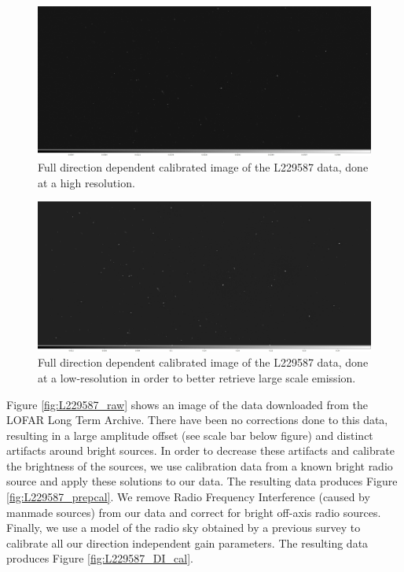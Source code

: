 \begin{figure}[!htb]
    \centering
    \includegraphics[width=.8\linewidth]{background/figures/full_ampphase.jpeg}
    \caption[Fully calibrated image]{Full direction dependent calibrated image of the L229587 data, done at a high resolution. }
    \label{fig:L229587_full_high}
\end{figure}

\begin{figure}[!htb]
    \centering
    \includegraphics[width=.8\linewidth]{background/figures/full_low_ampphase.jpeg}
    \caption[Fully calibrated low-resolution image]{Full direction dependent calibrated image of the L229587 data, done at a low-resolution in order to better retrieve large scale emission. }
    \label{fig:L229587_full_low}
\end{figure}



Figure \ref{fig:L229587_raw} shows an image of the data downloaded from the LOFAR Long Term Archive. There have been no corrections done to this data, resulting in a large amplitude offset (see scale bar below figure) and distinct artifacts around bright sources. In order to decrease these artifacts and calibrate the brightness of the sources, we use calibration data from a known bright radio source and apply these solutions to our data.  The resulting data produces Figure \ref{fig:L229587_prepcal}. We remove Radio Frequency Interference (caused by manmade sources) from our data and correct for bright off-axis radio sources. Finally, we use a model of the radio sky obtained by a previous survey to calibrate all our direction independent gain parameters. The resulting data produces Figure \ref{fig:L229587_DI_cal}.

